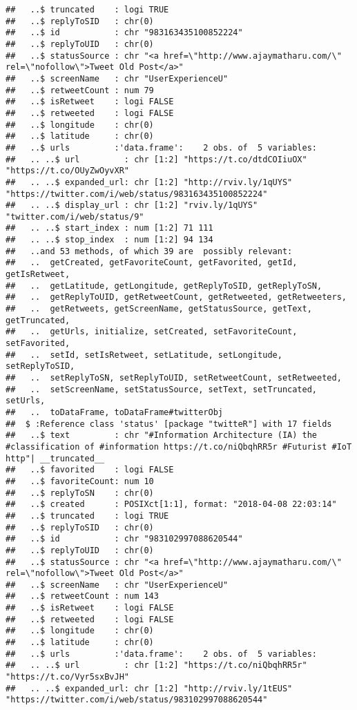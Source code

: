 \documentclass[]{article}
\begin{document}
\begin{verbatim}
##   ..$ truncated    : logi TRUE
##   ..$ replyToSID   : chr(0) 
##   ..$ id           : chr "983163435100852224"
##   ..$ replyToUID   : chr(0) 
##   ..$ statusSource : chr "<a href=\"http://www.ajaymatharu.com/\" rel=\"nofollow\">Tweet Old Post</a>"
##   ..$ screenName   : chr "UserExperienceU"
##   ..$ retweetCount : num 79
##   ..$ isRetweet    : logi FALSE
##   ..$ retweeted    : logi FALSE
##   ..$ longitude    : chr(0) 
##   ..$ latitude     : chr(0) 
##   ..$ urls         :'data.frame':    2 obs. of  5 variables:
##   .. ..$ url         : chr [1:2] "https://t.co/dtdCOIiuOX" "https://t.co/OUyZwOyvXR"
##   .. ..$ expanded_url: chr [1:2] "http://rviv.ly/1qUYS" "https://twitter.com/i/web/status/983163435100852224"
##   .. ..$ display_url : chr [1:2] "rviv.ly/1qUYS" "twitter.com/i/web/status/9"
##   .. ..$ start_index : num [1:2] 71 111
##   .. ..$ stop_index  : num [1:2] 94 134
##   ..and 53 methods, of which 39 are  possibly relevant:
##   ..  getCreated, getFavoriteCount, getFavorited, getId, getIsRetweet,
##   ..  getLatitude, getLongitude, getReplyToSID, getReplyToSN,
##   ..  getReplyToUID, getRetweetCount, getRetweeted, getRetweeters,
##   ..  getRetweets, getScreenName, getStatusSource, getText, getTruncated,
##   ..  getUrls, initialize, setCreated, setFavoriteCount, setFavorited,
##   ..  setId, setIsRetweet, setLatitude, setLongitude, setReplyToSID,
##   ..  setReplyToSN, setReplyToUID, setRetweetCount, setRetweeted,
##   ..  setScreenName, setStatusSource, setText, setTruncated, setUrls,
##   ..  toDataFrame, toDataFrame#twitterObj
##  $ :Reference class 'status' [package "twitteR"] with 17 fields
##   ..$ text         : chr "#Information Architecture (IA) the #classification of #information https://t.co/niQbqhRR5r #Futurist #IoT http"| __truncated__
##   ..$ favorited    : logi FALSE
##   ..$ favoriteCount: num 10
##   ..$ replyToSN    : chr(0) 
##   ..$ created      : POSIXct[1:1], format: "2018-04-08 22:03:14"
##   ..$ truncated    : logi TRUE
##   ..$ replyToSID   : chr(0) 
##   ..$ id           : chr "983102997088620544"
##   ..$ replyToUID   : chr(0) 
##   ..$ statusSource : chr "<a href=\"http://www.ajaymatharu.com/\" rel=\"nofollow\">Tweet Old Post</a>"
##   ..$ screenName   : chr "UserExperienceU"
##   ..$ retweetCount : num 143
##   ..$ isRetweet    : logi FALSE
##   ..$ retweeted    : logi FALSE
##   ..$ longitude    : chr(0) 
##   ..$ latitude     : chr(0) 
##   ..$ urls         :'data.frame':    2 obs. of  5 variables:
##   .. ..$ url         : chr [1:2] "https://t.co/niQbqhRR5r" "https://t.co/Vyr5sxBvJH"
##   .. ..$ expanded_url: chr [1:2] "http://rviv.ly/1tEUS" "https://twitter.com/i/web/status/983102997088620544"

\end{verbatim}
\end{document}
